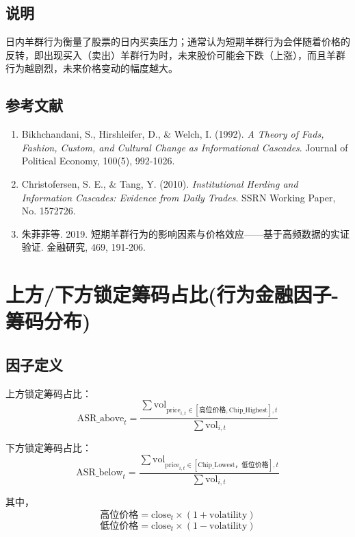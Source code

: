 \documentclass{article}
\begin{document}
\subsection{说明}
日内羊群行为衡量了股票的日内买卖压力；通常认为短期羊群行为会伴随着价格的反转，即出现买入（卖出）羊群行为时，未来股价可能会下跌（上涨），而且羊群行为越剧烈，未来价格变动的幅度越大。

\subsection{参考文献}
\begin{enumerate}
    \item Bikhchandani, S., Hirshleifer, D., \& Welch, I. (1992). \textit{A Theory of Fads, Fashion, Custom, and Cultural Change as Informational Cascades}. Journal of Political Economy, 100(5), 992-1026.
    \item Christofersen, S. E., \& Tang, Y. (2010). \textit{Institutional Herding and Information Cascades: Evidence from Daily Trades}. SSRN Working Paper, No. 1572726.
    \item 朱菲菲等. 2019. 短期羊群行为的影响因素与价格效应——基于高频数据的实证验证. 金融研究, 469, 191-206.
\end{enumerate}

\section{上方/下方锁定筹码占比(行为金融因子-筹码分布)}

\subsection{因子定义}

上方锁定筹码占比：
\begin{equation}
    \mathrm{ASR\_above}_t = \frac{\sum \mathrm{vol}_{\mathrm{price}_{i,t} \in [\text{高位价格}, \mathrm{Chip\_Highest}],t}}{\sum \mathrm{vol}_{i,t}}
\end{equation}

下方锁定筹码占比：
\begin{equation}
    \mathrm{ASR\_below}_t = \frac{\sum \mathrm{vol}_{\mathrm{price}_{i,t} \in [ \mathrm{Chip\_Lowest}，\text{低位价格}],t}}{\sum \mathrm{vol}_{i,t}}
\end{equation}

其中，
\begin{equation}
    \text{高位价格} = \mathrm{close}_t \times (1 + \mathrm{volatility})
\end{equation}
\begin{equation}
    \text{低位价格} = \mathrm{close}_t \times (1 - \mathrm{volatility})
\end{equation}
\end{document}
